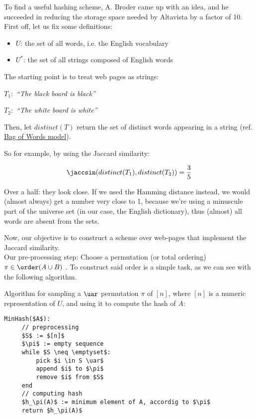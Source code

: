 	To find a useful hashing scheme, A. Broder came up with an idea, and he succeeded in reducing the storage space needed by Altavista by a factor of 10.\\
	First off, let us fix some definitions:
	\begin{itemize}
	\item $U$: the set of all words, i.e. the English vocabulary
	\item $U^*$: the set of all strings composed of English words
	\end{itemize}
	
	The starting point is to treat web pages as strings:
	
	$T_1:$ \textit{``The black board is black''}
	
	$T_2:$ \textit{``The white board is white''}
	
	Then, let $distinct(T)$ return the set of distinct words appearing in a string (ref. \href{https://en.wikipedia.org/wiki/Bag-of-words_model}{Bag of Words model}).
	
	So for example, by using the Jaccard similarity:
    
    \begin{equation}
    \jaccsim(distinct(T_1), distinct(T_2))= \frac{3}{5}
    \end{equation}
	
	Over a half: they look close. If we used the Hamming distance instead, we would (almost always) get a number very close to 1, because we're using a minuscule part of the universe set (in our case, the English dictionary), thus (almost) all words are absent from the sets.
	
	Now, our objective is to construct a scheme over web-pages that implement the Jaccard similarity.\\
	Our pre-processing step: Choose a permutation (or total ordering) $\pi \in \order(A \cup B)$ \uar. To construct said order is a simple task, as we can see with the following algorithm.
	
	\newpage
	Algorithm for sampling a $\uar$ permutation $\pi$ of $[n]$, where $[n]$ is a numeric representation of $U$, and using it to compute the hash of $A$:
	\begin{lstlisting}[caption={min hash or shingles algorithm},label={lst:min_hash}]
MinHash($A$):
     // preprocessing
     $S$ := $[n]$
     $\pi$ := empty sequence
     while $S \neq \emptyset$:
         pick $i \in S \uar$
         append $i$ to $\pi$
         remove $i$ from $S$
     end
     // computing hash
     $h_\pi(A)$ := minimum element of A, accordig to $\pi$
     return $h_\pi(A)$
	\end{lstlisting}
	
